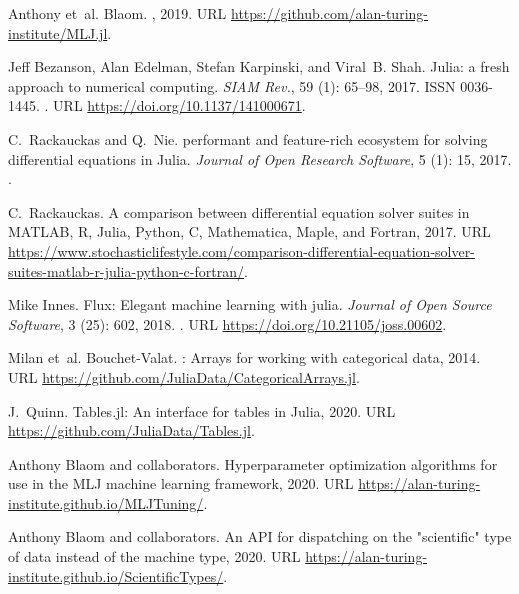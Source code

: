 \documentclass{article}
\begin{document}
\begin{thebibliography}{18}
Anthony et~al. Blaom.
, 2019.
\newblock URL \url{https://github.com/alan-turing-institute/MLJ.jl}.

Jeff Bezanson, Alan Edelman, Stefan Karpinski, and Viral~B. Shah.
\newblock Julia: a fresh approach to numerical computing.
\newblock \emph{SIAM Rev.}, 59 (1): 65--98, 2017.
\newblock ISSN 0036-1445.
\newblock {}.
\newblock URL \url{https://doi.org/10.1137/141000671}.

C.~Rackauckas and Q.~Nie.
 performant and feature-rich
  ecosystem for solving differential equations in {J}ulia.
\newblock \emph{Journal of Open Research Software}, 5 (1):
  15, 2017.
\newblock {}.

C.~Rackauckas.
\newblock A comparison between differential equation solver suites in {MATLAB},
  {R}, {J}ulia, {P}ython, {C}, {M}athematica, {M}aple, and {F}ortran, 2017.
\newblock URL
  \url{https://www.stochasticlifestyle.com/comparison-differential-equation-solver-suites-matlab-r-julia-python-c-fortran/}.

Mike Innes.
\newblock Flux: Elegant machine learning with julia.
\newblock \emph{Journal of Open Source Software}, 3 (25):
  602, 2018.
\newblock {}.
\newblock URL \url{https://doi.org/10.21105/joss.00602}.

Milan et~al. Bouchet-Valat.
: {A}rrays for working with categorical data,
  2014.
\newblock URL \url{https://github.com/JuliaData/CategoricalArrays.jl}.

J.~Quinn.
\newblock Tables.jl: {A}n interface for tables in {J}ulia, 2020.
\newblock URL \url{https://github.com/JuliaData/Tables.jl}.

Anthony Blaom and collaborators.
\newblock Hyperparameter optimization algorithms for use in the {MLJ} machine
  learning framework, 2020.
\newblock URL \url{https://alan-turing-institute.github.io/MLJTuning/}.

Anthony Blaom and collaborators.
\newblock An API for dispatching on the "scientific" type of data instead of the machine type, 2020.
\newblock URL \url{https://alan-turing-institute.github.io/ScientificTypes/}.


\end{thebibliography}
\end{document}
